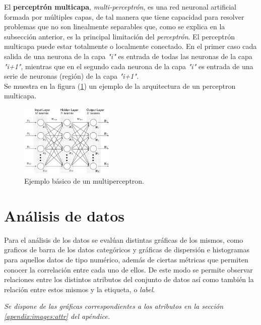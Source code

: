 \documentclass[osajnl,twocolumn,showpacs,superscriptaddress,10pt,floatfix]{revtex4-1} %
\begin{document}
El \textbf{perceptrón multicapa}, \textit{multi-perceptrón}, es una red neuronal artificial formada por múltiples capas, de tal manera que tiene capacidad para resolver problemas que no son linealmente separables que, como se explica en la subsección anterior, es la principal limitación del \textit{perceptrón}. El perceptrón multicapa puede estar totalmente o localmente conectado. En el primer caso cada salida de una neurona de la capa \textit{"i"} es entrada de todas las neuronas de la capa \textit{"i+1"}, mientras que en el segundo cada neurona de la capa \textit{"i"} es entrada de una serie de neuronas (región) de la capa \textit{"i+1"}. \\

Se muestra en la figura (\ref{figure:multiperceptron_example}) un ejemplo de la arquitectura de un perceptron multicapa.

\begin{figure}[H]
    \centering
    \includegraphics[width=0.4\textwidth]{theory/multiperceptron}
    \caption{Ejemplo básico de un multiperceptron.}
    \label{figure:multiperceptron_example}
\end{figure}

\section{Análisis de datos}

Para el análisis de los datos se evalúan distintas gráficas de los mismos, como graficos de barra de los datos categóricos y gráficas de dispersión e histogramas para aquellos datos de tipo numérico, además de ciertas métricas que permiten conocer la correlación entre cada uno de ellos. De este modo se permite observar relaciones entre los distintos atributos del conjunto de datos así como también la relación entre estos mismos y la etiqueta, o \textit{label}.

\begin{flushright}
\textit{\footnotesize Se dispone de las gráficas correspondientes a los atributos en la sección \ref{apendix:images:attr} del apéndice.}
\end{flushright}
\end{document}
